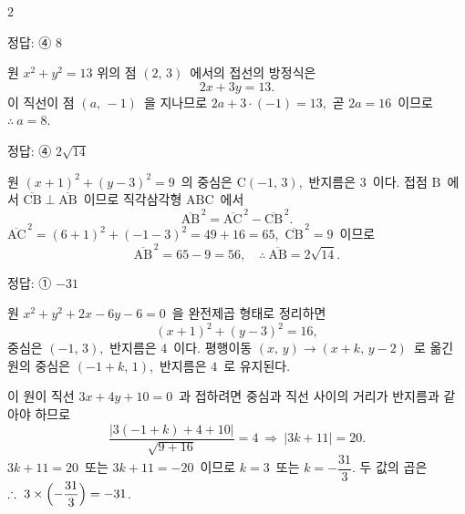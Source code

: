 \documentclass[10pt,fleqn]{article}
\begin{document}
\begin{multicols*}{2}
\begin{dmanswerbox}
정답: ④ $8$
\end{dmanswerbox}

원 $x^2 + y^2 = 13$ 위의 점 $(2,\,3)$\ 에서의 접선의 방정식은
\[ 2x + 3y = 13. \]
이 직선이 점 $(a,\,-1)$\ 을 지나므로 $2a + 3 \cdot (-1) = 13$,\ 곧 $2a = 16$\ 이므로 $\therefore\ a = 8$.

\begin{dmanswerbox}
정답: ④ $2\sqrt{14}$
\end{dmanswerbox}

원 $(x+1)^2 + (y-3)^2 = 9$\ 의 중심은 $\mathrm{C}(-1,\,3)$,\ 반지름은 $3$\ 이다. 접점 $\mathrm{B}$\ 에서 $\overline{\mathrm{CB}} \perp \overline{\mathrm{AB}}$\ 이므로 직각삼각형 $\mathrm{ABC}$\ 에서
\[ \overline{\mathrm{AB}}^{\,2} = \overline{\mathrm{AC}}^{\,2} - \overline{\mathrm{CB}}^{\,2}. \]
$\overline{\mathrm{AC}}^{\,2} = (6+1)^2 + (-1-3)^2 = 49 + 16 = 65$,\ $\overline{\mathrm{CB}}^{\,2} = 9$\ 이므로
\[ \overline{\mathrm{AB}}^{\,2} = 65 - 9 = 56,\quad \therefore\ \overline{\mathrm{AB}} = 2\sqrt{14}. \]

\begin{dmanswerbox}
정답: ① $-31$
\end{dmanswerbox}

원 $x^2 + y^2 + 2x - 6y - 6 = 0$\ 을 완전제곱 형태로 정리하면
\[ (x+1)^2 + (y-3)^2 = 16, \]
중심은 $(-1,\,3)$,\ 반지름은 $4$\ 이다. 평행이동 $(x,\,y) \to (x+k,\,y-2)$\ 로 옮긴 원의 중심은 $(-1+k,\,1)$,\ 반지름은 $4$\ 로 유지된다.

이 원이 직선 $3x + 4y + 10 = 0$\ 과 접하려면 중심과 직선 사이의 거리가 반지름과 같아야 하므로
\[ \dfrac{|3(-1+k) + 4 + 10|}{\sqrt{9+16}} = 4\ \Longrightarrow\ |3k + 11| = 20. \]
$3k + 11 = 20$\ 또는 $3k + 11 = -20$\ 이므로 $k = 3$\ 또는 $k = -\dfrac{31}{3}$. 두 값의 곱은 $\therefore\ 3 \times \Bigl(-\dfrac{31}{3}\Bigr) = -31$.


\end{multicols*}
\end{document}
